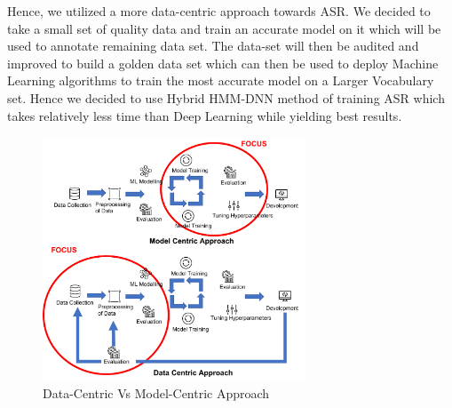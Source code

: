 Hence, we utilized a more data-centric approach towards ASR. We decided to take a small set of quality data and train an accurate model on it which will be used to annotate remaining data set. The data-set will then be audited and improved to build a golden data set which can then be used to deploy Machine Learning algorithms to train the most accurate model on a Larger Vocabulary set. Hence we decided to use Hybrid HMM-DNN method of training ASR which takes relatively less time than Deep Learning while yielding best results. 

\begin{figure}[htb]
    \centering
    \includegraphics[width=0.7\textwidth]{img/datacentervsmlcenter - 2.png}
    \caption{Data-Centric Vs Model-Centric Approach}
    \label{fig:datacent-vs-modelcent}
\end{figure}

